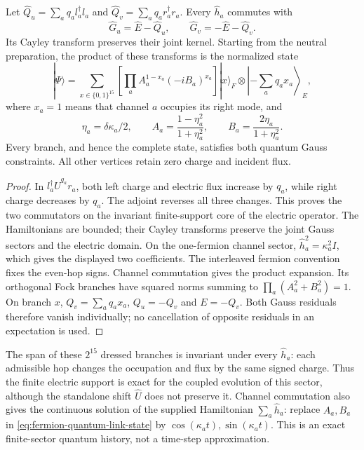 \begin{proposition}
\label{prop:fermion-quantum-link-gauss}
Let
$\widehat Q_u=\sum_aq_a l_a^\dagger l_a$ and
$\widehat Q_v=\sum_aq_a r_a^\dagger r_a$.
Every $\widehat h_a$ commutes with
\[
 \widehat G_u=\widehat E-\widehat Q_u,\qquad
 \widehat G_v=-\widehat E-\widehat Q_v.
\]
Its Cayley transform preserves their joint kernel. Starting from the
neutral preparation, the product of these transforms is the normalized
state
\begin{equation}
 |\Psi\rangle=
 \sum_{x\in\{0,1\}^{15}}
 \left[\prod_a A_a^{1-x_a}(-iB_a)^{x_a}\right]
 |x\rangle_{\!F}\otimes
 \left|-\sum_aq_ax_a\right\rangle_{\!E},
 \label{eq:fermion-quantum-link-state}
\end{equation}
where $x_a=1$ means that channel $a$ occupies its right mode, and
\[
 \eta_a=\delta\kappa_a/2,\qquad
 A_a=\frac{1-\eta_a^2}{1+\eta_a^2},\qquad
 B_a=\frac{2\eta_a}{1+\eta_a^2}.
\]
Every branch, and hence the complete state, satisfies both quantum Gauss
constraints. All other vertices retain zero charge and incident flux.
\end{proposition}
\begin{proof}
In $l_a^\dagger\widehat U^{q_a}r_a$, both left charge and electric
flux increase by $q_a$, while right charge decreases by $q_a$. The
adjoint reverses all three changes. This proves the two commutators on
the invariant finite-support core of the electric operator. The
Hamiltonians are bounded; their Cayley transforms preserve the joint Gauss
sectors and the electric domain. On the one-fermion channel sector,
$\widehat h_a^2=\kappa_a^2I$, which gives the displayed two coefficients.
The interleaved fermion convention fixes the even-hop signs. Channel
commutation gives the product expansion. Its orthogonal Fock branches
have squared norms summing to
$\prod_a(A_a^2+B_a^2)=1$.
On branch $x$, $Q_v=\sum_aq_ax_a$, $Q_u=-Q_v$ and $E=-Q_v$.
Both Gauss residuals therefore vanish individually; no cancellation of
opposite residuals in an expectation is used.
\end{proof}

The span of these $2^{15}$ dressed branches is invariant under every
$\widehat h_a$: each admissible hop changes the occupation and flux by the
same signed charge. Thus the finite electric support is exact for the
coupled evolution of this sector, although the standalone shift
$\widehat U$ does not preserve it. Channel commutation also gives the
continuous solution of the supplied Hamiltonian $\sum_a\widehat h_a$:
replace $A_a,B_a$ in \eqref{eq:fermion-quantum-link-state} by
$\cos(\kappa_at),\sin(\kappa_at)$. This is an exact finite-sector quantum
history, not a time-step approximation.

